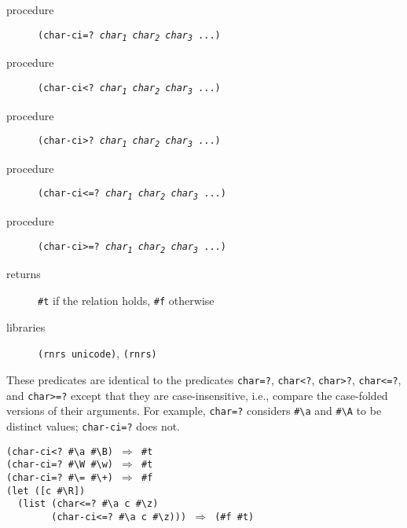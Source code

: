 \begin{description}

\label{objects_s202}\item[procedure] \texttt{(char-ci=? \textit{char\textsubscript{1}} \textit{char\textsubscript{2}} \textit{char\textsubscript{3}} ...)}



\item[procedure] \texttt{(char-ci\textless{}? \textit{char\textsubscript{1}} \textit{char\textsubscript{2}} \textit{char\textsubscript{3}} ...)}



\item[procedure] \texttt{(char-ci\textgreater{}? \textit{char\textsubscript{1}} \textit{char\textsubscript{2}} \textit{char\textsubscript{3}} ...)}



\item[procedure] \texttt{(char-ci\textless{}=? \textit{char\textsubscript{1}} \textit{char\textsubscript{2}} \textit{char\textsubscript{3}} ...)}



\item[procedure] \texttt{(char-ci\textgreater{}=? \textit{char\textsubscript{1}} \textit{char\textsubscript{2}} \textit{char\textsubscript{3}} ...)}



\item[returns] \texttt{\#{}t} if the relation holds, \texttt{\#{}f} otherwise


\item[libraries] \texttt{(rnrs unicode)}, \texttt{(rnrs)}
\end{description}


These predicates are identical to the predicates \texttt{char=?}, \texttt{char\textless{}?},
\texttt{char\textgreater{}?}, \texttt{char\textless{}=?}, and \texttt{char\textgreater{}=?} except that they are
case-insensitive, i.e., compare the case-folded versions of their arguments.
For example, \texttt{char=?} considers \texttt{\#{}\textbackslash{}a} and \texttt{\#{}\textbackslash{}A} to be
distinct values; \texttt{char-ci=?} does not.


\begin{alltt}
(char-ci\textless{}? \#{}\textbackslash{}a \#{}\textbackslash{}B) \(\Rightarrow\) \#{}t
(char-ci=? \#{}\textbackslash{}W \#{}\textbackslash{}w) \(\Rightarrow\) \#{}t
(char-ci=? \#{}\textbackslash{}= \#{}\textbackslash{}+) \(\Rightarrow\) \#{}f
(let ([c \#{}\textbackslash{}R])
  (list (char\textless{}=? \#{}\textbackslash{}a c \#{}\textbackslash{}z)
        (char-ci\textless{}=? \#{}\textbackslash{}a c \#{}\textbackslash{}z))) \(\Rightarrow\) (\#{}f \#{}t)
\end{alltt}

